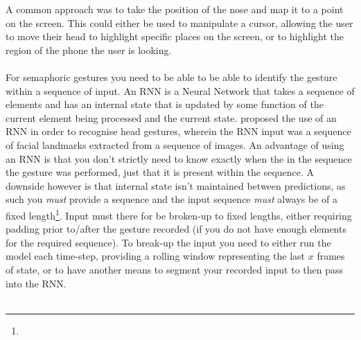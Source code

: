 A common approach was to take the position of the nose and map it to a point on the screen. This could either be used to manipulate a cursor\cite{gorodnichy2004nouse, varona2008hands, onuki2016combined}, allowing the user to move their head to highlight specific places on the screen, or to highlight the region of the phone the user is looking\cite{hueber2020headbang,voelker2020headreach,roig2015face}.
\\\\
For semaphoric gestures you need to be able to be able to identify the gesture within a sequence of input.
An RNN is a Neural Network that takes a sequence of elements and has an internal state that is updated by some function of the current element being processed and the current state.
\citeauthor{sharma2018recognizing} proposed the use of an RNN in order to recognise head gestures, wherein the RNN input was a sequence of facial landmarks extracted from a sequence of images\cite{sharma2018recognizing}. 
An advantage of using an RNN is that you don't strictly need to know exactly when the in the sequence the gesture was performed, just that it is present within the sequence.
A downside however is that internal state isn't maintained between predictions, as such you \textit{must} provide a sequence and the input sequence \textit{must} always be of a fixed length\footnote{}. Input must there for be broken-up to fixed lengths, either requiring padding prior to/after the gesture recorded (if you do not have enough elements for the required sequence). To break-up the input you need to either run the model each time-step, providing a rolling window representing the last $x$ frames of state, or to have another means to segment your recorded input to then pass into the RNN.
\\\\
